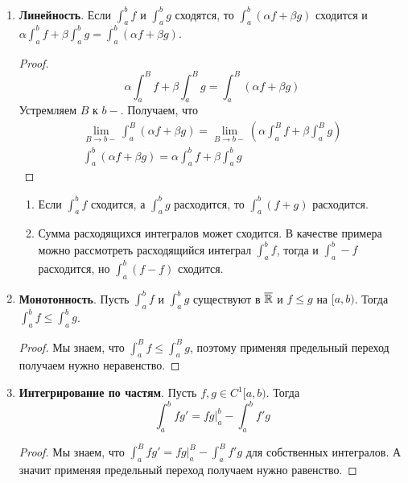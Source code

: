 \begin{enumerate}
  \item \textbf{Линейность}. Если $\int_{a}^{b} f$ и $\int_{a}^{b} g$ сходятся, то $\int_{a}^{b}(\alpha f + \beta g)$ сходится и $\alpha\int_{a}^{b} f + \beta\int_{a}^{b} g = \int_{a}^{b}(\alpha f + \beta g)$.
  \begin{proof}
    \begin{equation*}
      \alpha\int_{a}^{B} f + \beta\int_{a}^{B} g = \int_{a}^{B}(\alpha f + \beta g)
    \end{equation*}
    Устремляем $B$ к $b-$. Получаем, что
    \begin{equation*}
      \begin{gathered}
        \lim\limits_{B \to b-} \int_{a}^{B}(\alpha f + \beta g) = \lim\limits_{B \to b-}\left(\alpha\int_{a}^{B} f + \beta\int_{a}^{B} g\right) \\
        \int_{a}^{b} (\alpha f + \beta g) = \alpha \int_{a}^{b} f + \beta \int_{a}^{b} g
      \end{gathered}
    \end{equation*}
  \end{proof}
  \begin{notice}
    \begin{enumerate}[1)]
      \item Если $\int_{a}^{b} f$ сходится, а $\int_{a}^{b} g$ расходится, то $\int_{a}^{b}(f + g)$ расходится.

      \item Сумма расходящихся интегралов может сходится. В качестве примера можно рассмотреть расходящийся интеграл $\int_{a}^{b} f$, тогда и $\int_{a}^{b} -f$ расходится, но $\int_{a}^{b} (f - f)$ сходится.
    \end{enumerate}
  \end{notice}

  \item \textbf{Монотонность}. Пусть $\int_{a}^{b} f$ и $\int_{a}^{b} g$ существуют в $\overline{\mathbb{R}}$ и $f \leq g$ на $[a, b)$. Тогда $\int_{a}^{b} f \leq \int_{a}^{b} g$.
  \begin{proof}
    Мы знаем, что $\int_{a}^{B} f \leq \int_{a}^{B} g$, поэтому применяя предельный переход получаем нужно неравенство.
  \end{proof}

  \item \textbf{Интегрирование по частям}. Пусть $f, g \in C^{1}[a, b)$. Тогда
  \begin{equation*}
    \int_{a}^{b} fg' = fg \Big|_{a}^{b} - \int_{a}^{b} f'g
  \end{equation*}
  \begin{proof}
    Мы знаем, что $\int_{a}^{B} fg' = fg \Big|_{a}^{B} - \int_{a}^{B} f'g$ для собственных интегралов. А значит применяя предельный переход получаем нужно равенство.
  \end{proof}


\end{enumerate}
